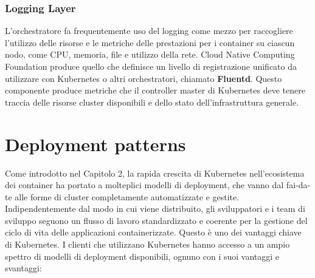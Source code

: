 \documentclass[12pt, a4paper]{report}
\begin{document}
\subsection{Logging Layer}
L'orchestratore fa frequentemente uso del logging come mezzo per raccogliere l'utilizzo delle risorse e le metriche delle prestazioni per i container su ciascun nodo, come CPU, memoria, file e utilizzo della rete. Cloud Native Computing Foundation produce quello che definisce un livello di registrazione unificato da utilizzare con Kubernetes o altri orchestratori, chiamato \textbf{Fluentd}. Questo componente produce metriche che il controller master di Kubernetes deve tenere traccia delle risorse cluster disponibili e dello stato dell'infrastruttura generale.

\chapter{Deployment patterns}
Come introdotto nel Capitolo 2, la rapida crescita di Kubernetes nell'ecosistema dei container ha portato a molteplici modelli di deployment, che vanno dal fai-da-te alle forme di cluster completamente automatizzate e gestite. Indipendentemente dal modo in cui viene distribuito, gli sviluppatori e i team di sviluppo seguono un flusso di lavoro standardizzato e coerente per la gestione del ciclo di vita delle applicazioni containerizzate. Questo è uno dei vantaggi chiave di Kubernetes.
I clienti che utilizzano Kubernetes hanno accesso a un ampio spettro di modelli di deployment disponibili, ognuno con i suoi vantaggi e svantaggi:
\end{document}
